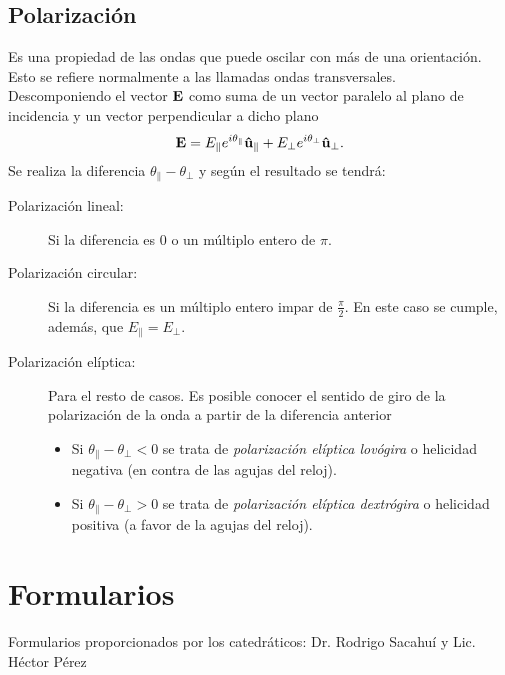 \section{Polarización}
Es una propiedad de las ondas que puede oscilar con más de una orientación. Esto se refiere normalmente a las llamadas ondas transversales. \\
Descomponiendo el vector $\vb{E}$ como suma de un vector paralelo al plano de incidencia y un vector perpendicular a dicho plano
\begin{equation}
	\vb{E} = E_\parallel e^{i\theta_\parallel} \vu{u} _\parallel + E_\perp e^{i\theta_\perp} \vu{u}_\perp.
\end{equation}
Se realiza la diferencia $\theta _\parallel - \theta _\perp$ y según el resultado se tendrá:
\begin{description}
	\item[Polarización lineal: ] Si la diferencia es $0$ o un múltiplo entero de $\pi$.
	\item[Polarización circular: ] Si la diferencia es un múltiplo entero impar de $\frac{\pi}{2}$. En este caso se cumple, además, que $E_\parallel = E_\perp$.
	\item[Polarización elíptica: ] Para el resto de casos. Es posible conocer el sentido de giro de la polarización de la onda a partir de la diferencia anterior 
	\begin{itemize}
		\item Si $\theta _\parallel - \theta _\perp < 0$ se trata de \textit{polarización elíptica lovógira} o helicidad negativa (en contra de las agujas del reloj).
		\item Si $\theta _\parallel - \theta _\perp > 0$ se trata de \textit{polarización elíptica dextrógira} o helicidad positiva (a favor de la agujas del reloj).
	\end{itemize}
\end{description}



\chapter{Formularios}
Formularios proporcionados por los catedráticos: Dr. Rodrigo Sacahuí y Lic. Héctor Pérez









































